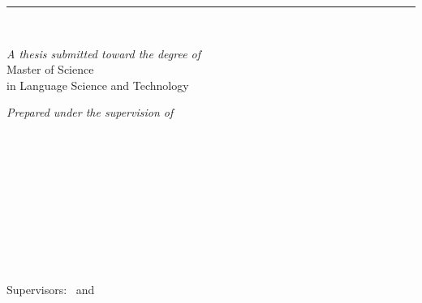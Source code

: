 %
\begin{titlepage}
	\tgherosfont
	\flushright
	\hfill
	\vfill
	
	{\color{ctcolorsection}%
	{\LARGE\textbf{\thesisTitle}} \par
	{\Large \thesisSubtitle} \par
	} %
	
	\rule[5pt]{\textwidth}{.4pt} \par
	
	{\LARGE \authorName} \\[2mm]

	\vfill
	
	
	\textit{A thesis submitted toward the degree of} \\[1mm]
	{\Large Master of Science} \\[1mm]
	{\large in Language Science and Technology} \\	
	
	\vfill	
	
	\textit{Prepared under the supervision of} \\
	\thesisFirstSupervisor \\
	\thesisSecondSupervisor 
	
	\vfill
	
	
	{\Large \thesisUniversity} \\[2mm]
	{\large \thesisUniversityDepartment} \\
	
	\vfill
	
	\thesisDate \\
	
\end{titlepage}


\hfill
\vfill
\small
{\tgherosfont \textbf{\authorName}} \\
\texttt{\authorContact}\\
\textit{\thesisTitle} \\
\thesisDate \\
Supervisors: \thesisFirstSupervisor\ and \thesisSecondSupervisor \\

